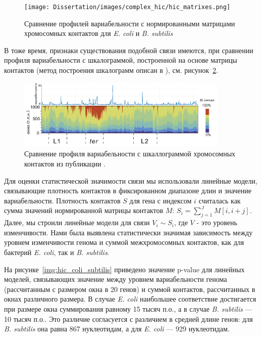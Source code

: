 \begin{figure}[!ht] 
  \center
    \texttt{[image: Dissertation/images/complex\_hic/hic\_matrixes.png]}
    \caption{Сравнение профилей вариабельности с нормированными матрицами хромосомных контактов для \textit{E. coli} и \textit{B. subtilis}}
    \label{img:hic_matrixes}
\end{figure}

В тоже время, признаки существования подобной связи имеются, при сравнении профиля вариабельности с шкалограммой, построенной на основе матрицы контактов (метод построения шкалограмм описан в \cite{lioy2018multiscale}), см. рисунок~\ref{img:scalogram_complexity_coli}.

\begin{figure}[!ht] 
  \center
    \includegraphics [width=0.9\textwidth] {Dissertation/images/complex_hic/hic_scalogram_complexity_coli.png}
    \caption{Сравнение профиля вариабельности с шкаллограммой хромосомных контактов из публикации \cite{lioy2018multiscale}.}
    \label{img:scalogram_complexity_coli}
\end{figure}

 Для оценки статистической значимости связи мы использовали линейные модели, связывающие плотность контактов в фиксированном диапазоне длин и значение вариабельности. Плотность контактов $S$ для гена с индексом $i$ считалась как сумма значений нормированной матрицы контактов $M$: $S_i = \sum_{j=1}^J M[i,i+j] $. Далее, мы строили линейные модели для связи $V_i \sim S_i$, где $V$ - это уровень изменчивости. Нами была выявлена статистически значимая зависимость между уровнем изменчивости генома и суммой межхромосомных контактов, как для бактерий \textit{E. coli}, так и \textit{B. subtilis}. 
 
 На рисунке~\ref{img:hic_coli_subtilis} приведено значение p-value для линейных моделей, связывающих значение между уровнем вариабельности генома (рассчитанным с размером окна в 20 генов) и суммой контактов, рассчитанных в окнах различного размера. В случае  \textit{E. coli} наибольшее соответствие достигается при размере окна суммирования равному 15 тысяч п.о., а в случае \textit{B. subtilis} --- 10 тысяч п.о.. Это различие согласуется с различием в средней длине генов: для \textit{B. subtilis} она равна 867 нуклеотидам, а для \textit{E. coli} --- 929 нуклеотидам.

